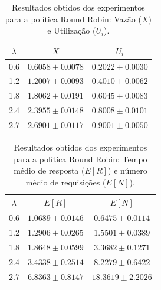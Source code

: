 \documentclass[conference]{IEEEtran}
\begin{document}
\begin{table}[H]
\centering
\caption{Resultados obtidos dos experimentos para a política Round Robin: Vazão ($X$) e Utilização ($U_i$).}
\label{tab:simulations_rr_throughput_utilization}
\begin{tabular}{ccc}
\toprule
$\lambda$ & $X$ & $U_i$ \\
\midrule
0.6 & $0.6058 \pm 0.0078$ & $0.2022 \pm 0.0030$ \\
1.2 & $1.2007 \pm 0.0093$ & $0.4010 \pm 0.0062$ \\
1.8 & $1.8062 \pm 0.0191$ & $0.6045 \pm 0.0083$ \\
2.4 & $2.3955 \pm 0.0148$ & $0.8008 \pm 0.0101$ \\
2.7 & $2.6901 \pm 0.0117$ & $0.9001 \pm 0.0050$ \\
\bottomrule
\end{tabular}
\end{table}

\begin{table}[H]
\centering
\caption{Resultados obtidos dos experimentos para a política Round Robin: Tempo médio de resposta ($E[R]$) e número médio de requisições ($E[N]$).}
\label{tab:simulations_rr_response_number}
\begin{tabular}{ccc}
\toprule
$\lambda$ & $E[R]$ & $E[N]$ \\
\midrule
0.6 & $1.0689 \pm 0.0146$ & $0.6475 \pm 0.0114$ \\
1.2 & $1.2906 \pm 0.0265$ & $1.5501 \pm 0.0389$ \\
1.8 & $1.8648 \pm 0.0599$ & $3.3682 \pm 0.1271$ \\
2.4 & $3.4338 \pm 0.2514$ & $8.2279 \pm 0.6422$ \\
2.7 & $6.8363 \pm 0.8147$ & $18.3619 \pm 2.2026$ \\
\bottomrule
\end{tabular}
\end{table}

\end{document}
